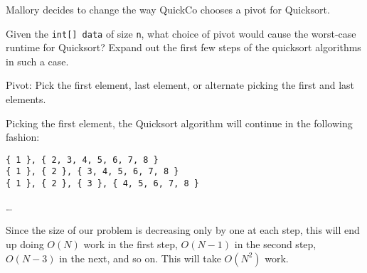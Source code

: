 \begin{blocksection}
\question Mallory decides to change the way QuickCo chooses a pivot for
Quicksort.

Given the \lstinline$int[] data$ of size \lstinline$n$, what choice of pivot
would cause the worst-case runtime for Quicksort? Expand out the first few
steps of the quicksort algorithms in such a case.

\begin{solution}[1in]
Pivot: Pick the first element, last element, or alternate picking the first and last elements.

Picking the first element, the Quicksort algorithm will continue
in the following fashion:

\begin{verbatim}
{ 1 }, { 2, 3, 4, 5, 6, 7, 8 }
{ 1 }, { 2 }, { 3, 4, 5, 6, 7, 8 }
{ 1 }, { 2 }, { 3 }, { 4, 5, 6, 7, 8 }
\end{verbatim}
\ldots

Since the size of our problem is decreasing only by one at each step, this will
end up doing $O(N)$ work in the first step, $O(N-1)$ in the second step,
$O(N-3)$ in the next, and so on. This will take $O(N^2)$ work.
\end{solution}
\end{blocksection}
